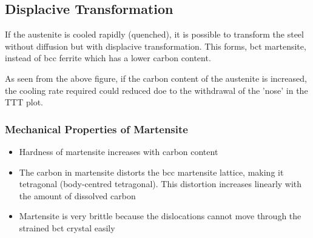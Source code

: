 

\subsection{Displacive Transformation} %
\label{sub:displacive_transformation}

If the austenite is cooled rapidly (quenched), it is possible to transform the steel without diffusion but with displacive transformation. This forms, bct martensite, instead of bcc ferrite which has a lower carbon content.


As seen from the above figure, if the carbon content of the austenite is increased, the cooling rate required could reduced doe to the withdrawal of the 'nose' in the TTT plot.

\subsubsection{Mechanical Properties of Martensite} %
\label{ssub:mechanical_properties_of_martensite}

\begin{itemize}
  \item Hardness of martensite increases with carbon content
  \item The carbon in martensite distorts the bcc martensite lattice, making it tetragonal (body-centred tetragonal). This distortion increases linearly with the amount of dissolved carbon
  \item Martensite is very brittle because the dislocations cannot move through the strained bct crystal easily
\end{itemize}



